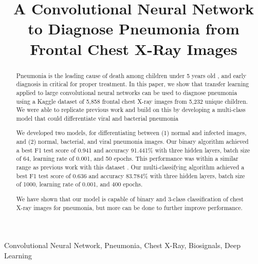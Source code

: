 \documentclass[conference]{IEEEtran}
\begin{document}
\title{A Convolutional Neural Network to Diagnose Pneumonia from Frontal Chest X-Ray Images\\
}

\author{
\and
{}
}

\maketitle

\begin{abstract}
Pneumonia is the leading cause of death among children under 5 years old \cite{unicef}, and early diagnosis in critical for proper treatment. In this paper, we show that transfer learning applied to large convolutional neural networks can be used to diagnose pneumonia using a Kaggle dataset of 5,858 frontal chest X-ray images \cite{kaggle} from 5,232 unique children. We were able to replicate previous work and build on this by developing a multi-class model that could differentiate viral and bacterial pneumonia

We developed two models, for differentiating between (1) normal and infected images, and (2) normal, bacterial, and viral pneumonia images. Our binary algorithm achieved a best F1 test score of 0.941 and accuracy 91.441\% with three hidden layers, batch size of 64, learning rate of 0.001, and 50 epochs. This performance was within a similar range as previous work with this dataset \cite{kermany2018identifying}. Our multi-classifying algorithm achieved a best F1 test score of 0.636 and accuracy 83.784\% with three hidden layers, batch size of 1000, learning rate of 0.001, and 400 epochs.

We have shown that our model is capable of binary and 3-class classification of chest X-ray images for pneumonia, but more can be done to further improve performance.

\end{abstract}

\begin{IEEEkeywords}
Convolutional Neural Network, Pneumonia, Chest X-Ray, Biosignals, Deep Learning
\end{IEEEkeywords}
\end{document}
